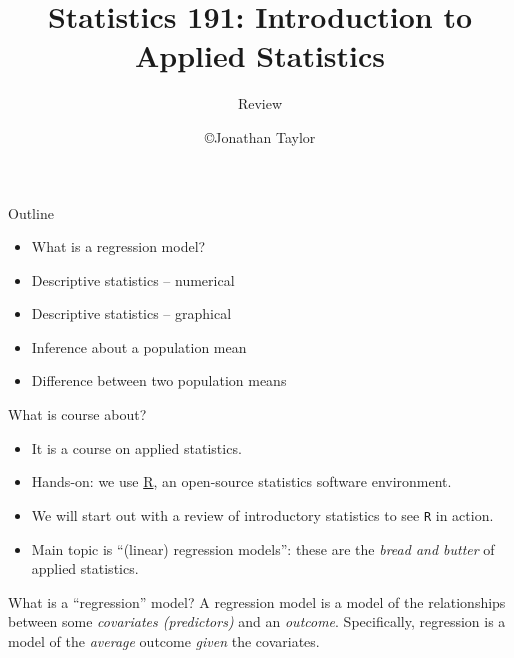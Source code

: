 \documentclass[handout]{beamer}
\title{Statistics 191: Introduction to Applied Statistics}
\subtitle{Review}
\author{\copyright Jonathan Taylor \\
   }
\begin{document}
   \begin{frame}
   \titlepage
   \end{frame}


   \begin{frame} 

   \begin{block}
   {Outline}
   \begin{itemize}

   \item What is a regression model?
   \item Descriptive statistics -- numerical
   \item Descriptive statistics -- graphical
   \item Inference about a population mean
   \item Difference between two population means
   \end{itemize}
   \end{block}
   \end{frame}


   \begin{frame} 

   \begin{block}
   {What is course about?}
   \begin{itemize}
   \item It is a course on applied statistics.

   \item Hands-on: we use \href{http://cran.r-project.org}{R}, an open-source statistics software environment.

   \item We will start out with a review of introductory statistics to see {\tt R} in action.
   \item Main topic is ``(linear) regression models'': these are the {\em bread and butter} of applied statistics.

   \end{itemize}
   \end{block}

   \begin{block}
   {What is a ``regression'' model? }
   A regression model is a model of the relationships between some
   {\em covariates (predictors)} and an {\em outcome}.
   Specifically, regression is a model of the {\em average} outcome {\em given}
   the covariates.
   \end{block}
   \end{frame}
\end{document}
